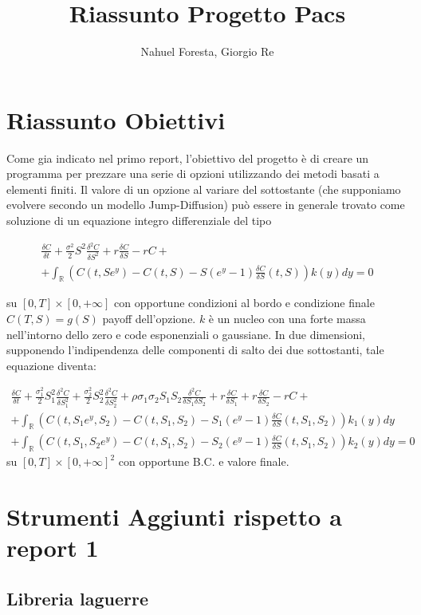 \documentclass[a4paper,10pt]{article}
\title{Riassunto Progetto Pacs}
\author{Nahuel Foresta, Giorgio Re}
\newcommand{\der}[2]{\frac{\delta #1}{\delta #2}}
\newcommand{\dder}[2]{\frac{\delta^2 #1}{\delta #2^2}}
\newcommand{\dmix}[3]{\frac{\delta^2 #1}{\delta #2 \delta #3}}
\begin{document}
\maketitle

\section{Riassunto Obiettivi}

Come gia indicato nel primo report, l'obiettivo del progetto è di creare un programma per prezzare una serie di opzioni utilizzando dei metodi basati a elementi finiti. Il valore di un opzione al variare del sottostante (che supponiamo evolvere secondo un modello Jump-Diffusion) può essere in generale trovato come soluzione di un equazione integro differenziale del tipo

\begin{multline}
 \der{C}{t}+\frac{\sigma^2}{2}S^2\dder{C}{S}+r\der{C}{S}-rC+\\+ \int_\mathbb{R}\left(C(t,Se^y)-C(t,S)-S(e^y-1)\der{C}{S}(t,S)\right)k(y)dy=0
\end{multline}

su $[0,T]\times[0,+\infty]$ con opportune condizioni al bordo e condizione finale $C(T,S)=g(S)$ payoff dell'opzione. $k$ è un nucleo con una forte massa nell'intorno dello zero e code esponenziali o gaussiane.
In due dimensioni, supponendo l'indipendenza delle componenti di salto dei due sottostanti, tale equazione diventa:


\begin{multline}
 \der{C}{t}+\frac{\sigma_1^2}{2}S_1^2\dder{C}{S_1}+\frac{\sigma_2^2}{2}S_2^2\dder{C}{S_2}+\rho\sigma_1\sigma_2 S_1 S_2 \dmix{C}{S_1}{S_2}+
 r\der{C}{S_1}+r\der{C}{S_2}-rC+ \\
 + \int_\mathbb{R}\left(C(t,S_1e^{y},S_2)-C(t,S_1,S_2)-S_1(e^y-1)\der{C}{S}(t,S_1,S_2)\right)k_1(y)dy\\
 + \int_\mathbb{R}\left(C(t,S_1,S_2e^{y})-C(t,S_1,S_2)-S_2(e^y-1)\der{C}{S}(t,S_1,S_2)\right)k_2(y)dy=0 
\end{multline}
su $[0,T]\times[0,+\infty]^2$ con opportune B.C. e valore finale.

\section{Strumenti Aggiunti rispetto a report 1}

\subsection{Libreria laguerre}
\end{document}
